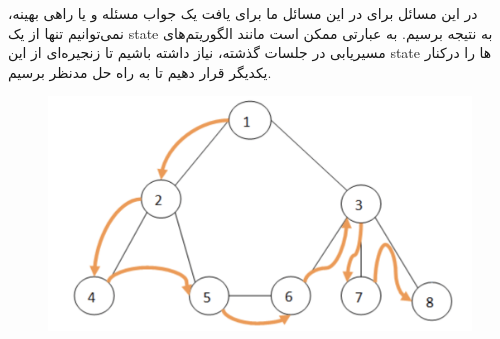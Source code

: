 در این مسائل برای
در این مسائل ما برای یافت یک جواب مسئله و یا راهی بهینه، نمی‌توانیم تنها از یک state به نتیجه برسیم.
به عبارتی ممکن است مانند الگوریتم‌های مسیریابی در جلسات گذشته، نیاز داشته باشیم تا زنجیره‌ای از این state ها را درکنار یکدیگر قرار دهیم تا به راه حل مدنظر برسیم.

\begin{figure}[H]
    \centering
    \includegraphics[width=0.8\linewidth]{source/DFS.png}
    \label{fig:state-partial}
\end{figure}